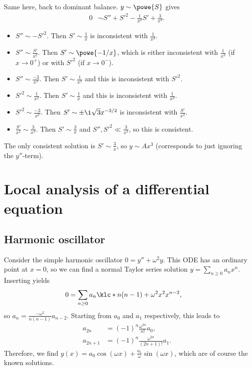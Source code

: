 \documentclass[english, parskip=full]{scrartcl}
\begin{document}
Same here, back to dominant balance.
$y\sim\powe{S}$ gives
\begin{align}
0 &\sim S'' + S'^2 - \frac{1}{x^2}S' + \frac{3}{x^3}.
\end{align}
\begin{itemize}
\item $S''\sim -S'^2$. Then $S'\sim\frac{1}{x}$ is inconsistent with $\frac{1}{x^3}$.
\item $S'' \sim \frac{S'}{x^2}$. Then $S' \sim \powe{-1/x}$, which is either inconsistent with $\frac{1}{x^3}$ (if $x\rightarrow 0^+$) or with $S'^2$ (if $x\rightarrow 0^-$).
\item $S''\sim \frac{-3}{x^3}$. Then $S'\sim \frac{1}{x^2}$ and this is inconsistent with $S'^2$.
\item $S'^2 \sim \frac{1}{x^2}$. Then $S'\sim\frac{1}{x}$ and this is inconsistent with $\frac{1}{x^3}$.
\item $S'^2 \sim \frac{-3}{x^3}$.
Then $S' \sim \pm\i \sqrt{3} x^{-3/2}$ is inconsistent with $\frac{S'}{x^2}$.
\item $\frac{S'}{x^2} \sim \frac{3}{x^3}$. Then $S'\sim \frac{3}{x}$ and $S'',S'^2\ll\frac{3}{x^3}$, so this is consistent.
\end{itemize}
The only consistent solution is $S'\sim\frac{3}{x}$, so $y\sim Ax^3$ (corresponds to just ignoring the $y''$-term).
\section{Local analysis of a differential equation}
\subsection{Harmonic oscillator}
Consider the simple harmonic oscillator $0=y''+\omega^2y$.
This ODE has an ordinary point at $x=0$, so we can find a normal Taylor series solution $y=\sum_{n\ge 0} a_n x^n$.
Inserting yields
\begin{align}
0 &= \sum_{n\ge 0} a_n \klc*{n(n-1) + \omega^2 x^2}x^{n-2},
\end{align}
so $a_n = \frac{-\omega^2}{n(n-1)}a_{n-2}$.
Starting from $a_0$ and $a_1$ respectively, this leads to
\begin{align}
a_{2n} &= (-1)^n \frac{\omega^{2n}}{n!}a_0,\\
a_{2n+1} &= (-1)^n \frac{\omega^{2n}}{(2n+1)!} a_1.
\end{align}
Therefore, we find $y(x) = a_0 \cos(\omega x) + \frac{a_1}{\omega} \sin(\omega x)$, which are of course the known solutions.
\end{document}
